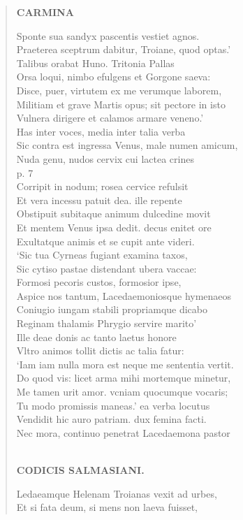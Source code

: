 \documentclass[11pt, a4paper]{report}
\begin{document}
\begin{verse}
    \begin{center} \textbf{CARMINA} \end{center} \marginpar{[40]} Sponte sua sandyx pascentis vestiet agnos. \\ Praeterea sceptrum dabitur, Troiane, quod optas.’ \\ Talibus orabat Huno. Tritonia Pallas \\ Orsa loqui, nimbo efulgens et Gorgone saeva: \\ Disce, puer, virtutem ex me verumque laborem, \\ Militiam et grave Martis opus; sit pectore in isto \\ Vulnera dirigere et calamos armare veneno.’ \\ Has inter voces, media inter talia verba \\ Sic contra est ingressa Venus, male numen amicum, \\ Nuda genu, nudos cervix cui lactea crines \\ p. 7 \\ Corripit in nodum; rosea cervice refulsit \\ Et vera incessu patuit dea. ille repente \\ Obstipuit subitaque animum dulcedine movit \\ Et mentem Venus ipsa dedit. decus enitet ore \\ Exultatque animis et se cupit ante videri. \\ ‘Sic tua Cyrneas fugiant examina taxos, \\ Sic cytiso pastae distendant ubera vaccae: \\ Formosi pecoris custos, formosior ipse, \\ Aspice nos tantum, Lacedaemoniosque hymenaeos \\ Coniugio iungam stabili propriamque dicabo \\ Reginam thalamis Phrygio servire marito’ \\ Ille deae donis ac tanto laetus honore \\ Vltro animos tollit dictis ac talia fatur: \\ ‘Iam iam nulla mora est neque me sententia vertit. \\ Do quod vis: licet arma mihi mortemque minetur, \\ Me tamen urit amor. vcniam quocumque vocaris; \\ Tu modo promissis maneas.’ ea verba locutus \\ Vendidit hic auro patriam. dux femina facti. \\ Nec mora, continuo penetrat Lacedaemona pastor \\ 
        ﻿\pagebreak 
    \begin{center} \textbf{CODICIS SALMASIANI.} \end{center} \marginpar{[41]} Ledaeamque Helenam Troianas vexit ad urbes, \\ Et si fata deum, si mens non laeva fuisset, \\ 
      \end{verse}
  
\end{document}
